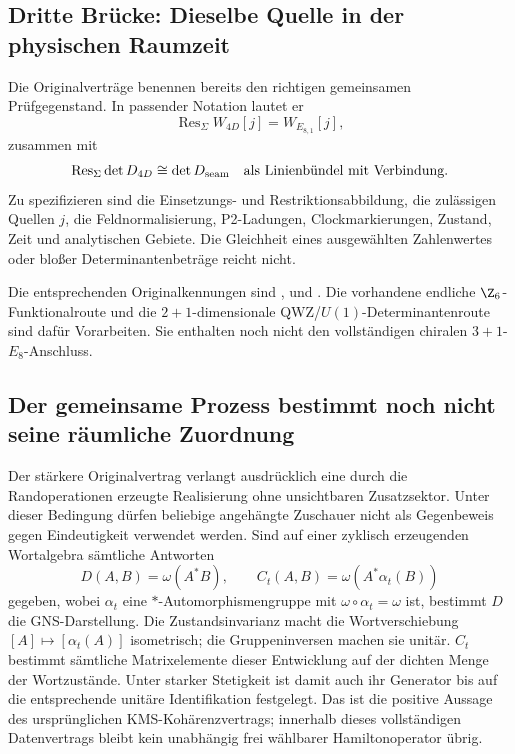 \subsection{Dritte Brücke: Dieselbe Quelle in der physischen Raumzeit}
Die Originalverträge benennen bereits den richtigen gemeinsamen Prüfgegenstand. In passender Notation lautet er
\begin{equation}\label{eq:physical}
\operatorname{Res}_\Sigma W_{4D}[j]=W_{E_{8,1}}[j],
\end{equation}
zusammen mit
\begin{equation}
\operatorname{Res}_\Sigma\det D_{4D}\cong\det D_{\rm seam}
\quad\text{als Linienbündel mit Verbindung}.
\end{equation}
Zu spezifizieren sind die Einsetzungs- und Restriktionsabbildung, die zulässigen Quellen $j$, die Feldnormalisierung, P2-Ladungen, Clockmarkierungen, Zustand, Zeit und analytischen Gebiete. Die Gleichheit eines ausgewählten Zahlenwertes oder bloßer Determinantenbeträge reicht nicht.

Die entsprechenden Originalkennungen sind
,
 und
.
Die vorhandene endliche $\Z_6$-Funktionalroute und die $2+1$-dimensionale QWZ/$U(1)$-Determinantenroute sind dafür Vorarbeiten. Sie enthalten noch nicht den vollständigen chiralen $3+1$-$E_8$-Anschluss.

\subsection{Der gemeinsame Prozess bestimmt noch nicht seine räumliche Zuordnung}
Der stärkere Originalvertrag  verlangt ausdrücklich eine durch die Randoperationen erzeugte Realisierung ohne unsichtbaren Zusatzsektor. Unter dieser Bedingung dürfen beliebige angehängte Zuschauer nicht als Gegenbeweis gegen Eindeutigkeit verwendet werden. Sind auf einer zyklisch erzeugenden Wortalgebra sämtliche Antworten
\begin{equation}
D(A,B)=\omega(A^*B),\qquad C_t(A,B)=\omega(A^*\alpha_t(B))
\end{equation}
gegeben, wobei $\alpha_t$ eine $*$-Automorphismengruppe mit $\omega\circ\alpha_t=\omega$ ist, bestimmt $D$ die GNS-Darstellung. Die Zustandsinvarianz macht die Wortverschiebung $[A]\mapsto[\alpha_t(A)]$ isometrisch; die Gruppeninversen machen sie unitär. $C_t$ bestimmt sämtliche Matrixelemente dieser Entwicklung auf der dichten Menge der Wortzustände. Unter starker Stetigkeit ist damit auch ihr Generator bis auf die entsprechende unitäre Identifikation festgelegt. Das ist die positive Aussage des ursprünglichen KMS-Kohärenzvertrags; innerhalb dieses vollständigen Datenvertrags bleibt kein unabhängig frei wählbarer Hamiltonoperator übrig.


